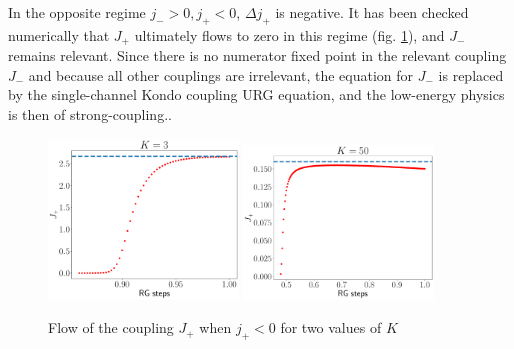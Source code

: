 \documentclass{revtex4-2}
\begin{document}
In the opposite regime \(j_- > 0, j_+ < 0\), \(\Delta j_+\) is negative. It has been checked numerically that \(J_+\) ultimately flows to zero in this regime (fig. \ref{irrel_Jplus}), and \(J_-\) remains relevant. Since there is no numerator fixed point in the relevant coupling \(J_-\) and because all other couplings are irrelevant, the equation for \(J_-\) is replaced by the single-channel Kondo coupling URG equation, and the low-energy physics is then of strong-coupling..
\begin{figure}[htpb]
	\centering
	\includegraphics[width=0.45\textwidth]{../numerics/irr_Jp_K=3.pdf}
	\includegraphics[width=0.45\textwidth]{../numerics/irr_Jp_K=50.pdf}
	\caption{Flow of the coupling \(J_+\) when \(j_+ < 0\) for two values of \(K\)}
	\label{irrel_Jplus}
\end{figure}
\end{document}
